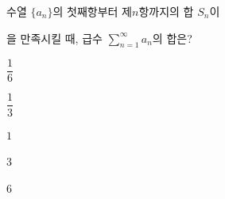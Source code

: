 수열 $\{a_n\}$의 첫째항부터 제$n$항까지의 합 $S_n$이 \par\smallskip{}\par\smallskip\noindent 을 만족시킬 때, 급수 $\displaystyle\sum_{n=1}^{\infty} a_n$의 합은?
\begin{choices32}{\rule[-3ex]{0pt}{8ex}$\dfrac{1}{6}$}{\rule[-3ex]{0pt}{8ex}$\dfrac{1}{3}$}{\rule[-3ex]{0pt}{8ex}$1$}{\rule[-3ex]{0pt}{8ex}$3$}{\rule[-3ex]{0pt}{8ex}$6$}\end{choices32}
